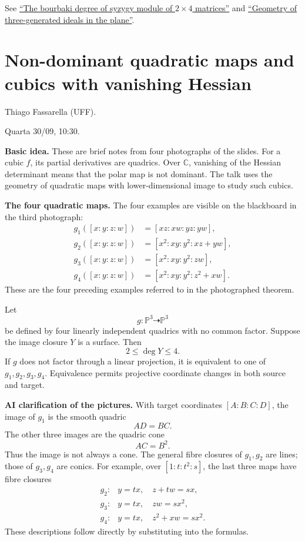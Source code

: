 See
\href{https://arxiv.org/abs/2604.04252}
{``The bourbaki degree of syzygy module of
$2\times4$ matrices''} and
\href{https://arxiv.org/abs/2609.17799}
{``Geometry of three-generated ideals in
the plane''}.

\section{Non-dominant quadratic maps and
cubics with
vanishing Hessian}
\label{section-thiago-fassarela}

Thiago Fassarella (UFF).

Quarta 30/09, 10:30.

\medskip\noindent
\textbf{Basic idea.}
These are brief notes from four
photographs of the slides.
For a cubic $f$, its partial derivatives
are quadrics. Over $\mathbb{C}$,
vanishing of the Hessian determinant
means that the polar map is not dominant.
The talk uses the geometry of quadratic
maps with lower-dimensional image to
study such cubics.

\medskip\noindent
\textbf{The four quadratic maps.}
The four examples are visible on the
blackboard in the third photograph:
$$
\begin{aligned}
g_1([x:y:z:w])&=[xz:xw:yz:yw],\\
g_2([x:y:z:w])&=[x^2:xy:y^2:xz+yw],\\
g_3([x:y:z:w])&=[x^2:xy:y^2:zw],\\
g_4([x:y:z:w])&=[x^2:xy:y^2:z^2+xw].
\end{aligned}
$$
These are the four preceding examples
referred to in the photographed theorem.

\begin{theorem}
\label{theorem-fassarella-quadratic-maps}
Let
$$
g:\mathbb{P}^3\dashrightarrow\mathbb{P}^3
$$
be defined by four linearly independent
quadrics with no common factor.
Suppose the image closure $Y$ is a
surface. Then
$$
2\leq\deg Y\leq4.
$$
If $g$ does not factor through a linear
projection, it is equivalent to one of
$g_1,g_2,g_3,g_4$.
Equivalence permits projective coordinate
changes in both source and target.
\end{theorem}

\medskip\noindent
\textbf{AI clarification of the pictures.}
With target coordinates $[A:B:C:D]$,
the image of $g_1$ is the smooth quadric
$$
AD=BC.
$$
The other three images are the quadric
cone
$$
AC=B^2.
$$
Thus the image is not always a cone.
The general fibre closures of $g_1,g_2$
are lines; those of $g_3,g_4$ are conics.
For example, over $[1:t:t^2:s]$,
the last three maps have fibre closures
$$
\begin{array}{ll}
g_2:&y=tx,\quad z+tw=sx,\\
g_3:&y=tx,\quad zw=sx^2,\\
g_4:&y=tx,\quad z^2+xw=sx^2.
\end{array}
$$
These descriptions follow directly by
substituting into the formulas.

